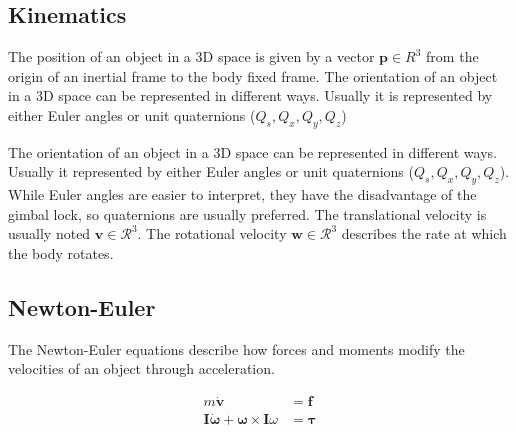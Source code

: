 \subsection{Kinematics}
The position of an object in a 3D space is given by a vector $\mathbf{p} \in R^3$ from the origin of an inertial frame to the body fixed frame. The orientation of an object in a 3D space can be represented in different ways. Usually it is represented by either Euler angles or unit quaternions ($Q_s, Q_x, Q_y, Q_z$)


The orientation of an object in a 3D space can be represented in different ways. Usually it represented by either Euler angles or unit quaternions ($Q_s, Q_x, Q_y, Q_z$). While Euler angles are easier to interpret, they have the disadvantage of the gimbal lock, so quaternions are usually preferred.
The translational velocity is usually noted $\mathbf{v} \in \mathcal{R}^3$. The rotational velocity $\mathbf{w} \in \mathcal{R}^3$ describes the rate at which the body rotates.

\subsection{Newton-Euler}
The Newton-Euler equations describe how forces and moments modify the velocities of an object through acceleration.

\begin{align}
m\dot{\mathbf{v}} &= \mathbf{f} \label{eq:newton1}\\
\mathbf{I}\dot{\mathbf{\omega}} + \mathbf{\omega} \times \mathbf{I}\omega &= \mathbf{\tau}
\end{align}


